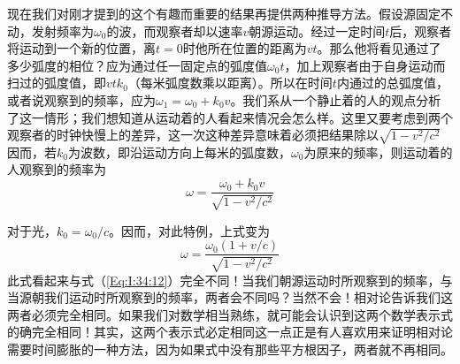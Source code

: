 现在我们对刚才提到的这个有趣而重要的结果再提供两种推导方法。假设源固定不动，发射频率为$\omega_0$的波，而观察者却以速率$v$朝源运动。经过一定时间$t$后，观察者将运动到一个新的位置，离$t=0$时他所在位置的距离为$vt$。那么他将看见通过了多少弧度的相位？应为通过任一固定点的弧度值$\omega_0t$，加上观察者由于自身运动而扫过的弧度值，即$vtk_0$（每米弧度数乘以距离）。所以在时间$t$内通过的总弧度值，或者说观察到的频率，应为$\omega_1=\omega_0+k_0v$。我们系从一个静止着的人的观点分析了这一情形；我们想知道从运动着的人看起来情况会怎么样。这里又要考虑到两个观察者的时钟快慢上的差异，这一次这种差异意味着必须把结果除以$\sqrt{1-v^2/c^2}$因而，若$k_0$为波数，即沿运动方向上每米的弧度数，$\omega_0$为原来的频率，则运动着的人观察到的频率为
\begin{equation}
    \label{Eq:I:34:13}
    \omega = \frac{\omega_0 + k_0v}{\sqrt{1-v^2/c^2}}
\end{equation}

对于光，$k_0=\omega_0/c$。因而，对此特例，上式变为
\begin{equation}
    \label{Eq:I:34:14}
    \omega = \frac{\omega_0(1 + v/c)}{\sqrt{1-v^2/c^2}}
\end{equation}
此式看起来与式（\ref{Eq:I:34:12}）完全不同！当我们朝源运动时所观察到的频率，与当源朝我们运动时所观察到的频率，两者会不同吗？当然不会！相对论告诉我们这两者必须完全相同。如果我们对数学相当熟练，就可能会认识到这两个数学表示式的确完全相同！其实，这两个表示式必定相同这一点正是有人喜欢用来证明相对论需要时间膨胀的一种方法，因为如果式中没有那些平方根因子，两者就不再相同。

